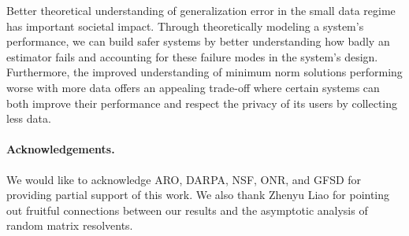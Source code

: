 \documentclass[thesis.tex]{subfiles}
\begin{document}
  Better theoretical understanding of generalization error in the small data
  regime has important societal impact. Through theoretically modeling a system's
  performance, we can build safer systems by better understanding how badly an
  estimator fails and accounting for these failure modes in the system's design.
  Furthermore, the improved understanding of minimum norm solutions performing
  worse with more data offers an appealing trade-off where certain systems can
  both improve their performance and respect the privacy of its users by
  collecting less data.
\fi

\paragraph{Acknowledgements.}
We would like to acknowledge ARO, DARPA, NSF, ONR, and GFSD for providing
partial support of this work. We also thank Zhenyu Liao for pointing
out fruitful connections between our results and the asymptotic
analysis of random matrix resolvents.

%   
%   

% 




\end{document}
